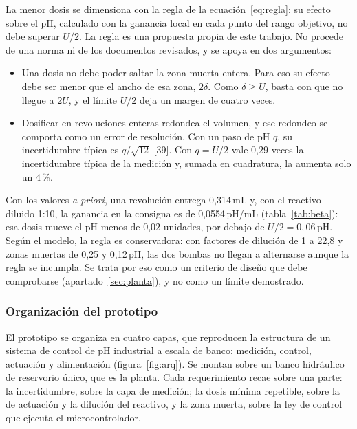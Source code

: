 
La menor dosis se dimensiona con la regla de la ecuación~\eqref{eq:regla}: su efecto sobre el pH, calculado con la ganancia local en cada punto del rango objetivo, no debe superar $U/2$. La regla es una propuesta propia de este trabajo. No procede de una norma ni de los documentos revisados, y se apoya en dos argumentos:
\begin{itemize}
\item Una dosis no debe poder saltar la zona muerta entera. Para eso su efecto debe ser menor que el ancho de esa zona, $2\delta$. Como $\delta\ge U$, basta con que no llegue a $2U$, y el límite $U/2$ deja un margen de cuatro veces.
\item Dosificar en revoluciones enteras redondea el volumen, y ese redondeo se comporta como un error de resolución. Con un paso de pH $q$, su incertidumbre típica es $q/\sqrt{12}$ [39]. Con $q=U/2$ vale 0,29 veces la incertidumbre típica de la medición y, sumada en cuadratura, la aumenta solo un 4\,\%.
\end{itemize}
Con los valores \emph{a priori}, una revolución entrega 0,314\,mL y, con el reactivo diluido 1:10, la ganancia en la consigna es de 0,0554\,pH/mL (tabla~\ref{tab:beta}): esa dosis mueve el pH menos de 0,02 unidades, por debajo de $U/2=0{,}06$\,pH. Según el modelo, la regla es conservadora: con factores de dilución de 1 a 22,8 y zonas muertas de 0,25 y 0,12\,pH, las dos bombas no llegan a alternarse aunque la regla se incumpla. Se trata por eso como un criterio de diseño que debe comprobarse (apartado~\ref{sec:planta}), y no como un límite demostrado.

\subsubsection{Organización del prototipo}\label{sec:org}
El prototipo se organiza en cuatro capas, que reproducen la estructura de un sistema de control de pH industrial a escala de banco: medición, control, actuación y alimentación (figura~\ref{fig:arq}). Se montan sobre un banco hidráulico de reservorio único, que es la planta. Cada requerimiento recae sobre una parte: la incertidumbre, sobre la capa de medición; la dosis mínima repetible, sobre la de actuación y la dilución del reactivo, y la zona muerta, sobre la ley de control que ejecuta el microcontrolador.


